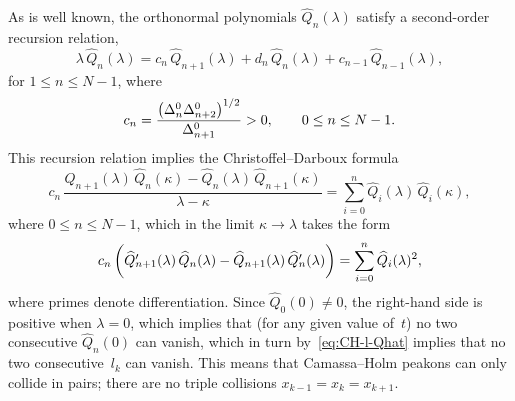 \documentclass[10pt,a4paper]{article} \pdfoutput=1 
\begin{document}
As is well known, the orthonormal polynomials $\widehat Q_n(\lambda)$ satisfy a second-order recursion relation,
\begin{equation}
  \label{eq:CH-orthpoly-recursion}
  \lambda \, \widehat Q_n(\lambda)
  = c_n \, \widehat Q_{n+1}(\lambda)
  + d_n \, \widehat Q_n(\lambda)
  + c_{n-1} \, \widehat Q_{n-1}(\lambda)
  ,
\end{equation}
for $1 \le n \le N-1$, where
\begin{equation}
  \label{eq:CH-christoffel-darboux-b}
  c_n
  = \frac{\big( \Delta^0_{n} \Delta^0_{\vphantom{n} \smash{n+2}} \big)^{1/2}}{\Delta^0_{n+1}}
  > 0
  ,
  \qquad 0 \le n \le N-1
  .
\end{equation}
This recursion relation implies the Christoffel--Darboux formula
\begin{equation*}
  c_n \, \frac{\widehat Q_{n+1}(\lambda) \, \widehat Q_n(\kappa) - \widehat Q_n(\lambda) \, \widehat Q_{n+1}(\kappa)}
  {\lambda-\kappa}
  =
  \sum_{i=0}^n \widehat Q_i(\lambda) \, \widehat Q_i(\kappa)
  ,
\end{equation*}
where $0 \le n \le N-1$,
which in the limit $\kappa \to \lambda$ takes the form
\begin{equation}
  \label{eq:CH-limiting-darboux}
  c_n \, \biggl( \widehat Q\rlap{$'$}_{n+1}(\lambda) \, \widehat Q_n(\lambda) - \widehat Q_{n+1}(\lambda) \, \widehat Q\rlap{$'$}_n(\lambda) \biggr)
  = \sum_{i=0}^n \widehat Q_i(\lambda)^2
  ,
\end{equation}
where primes denote differentiation.
Since $\widehat Q_0(0)\neq 0$, the right-hand side
is positive when $\lambda=0$, which implies that
(for any given value of~$t$) no two
consecutive $\widehat Q_n(0)$ can vanish, which in turn by~\eqref{eq:CH-l-Qhat}
implies that no two consecutive~$l_k$ can vanish.
This means that Camassa--Holm peakons can only collide in pairs;
there are no triple collisions $x_{k-1} = x_k = x_{k+1}$.
\end{document}
